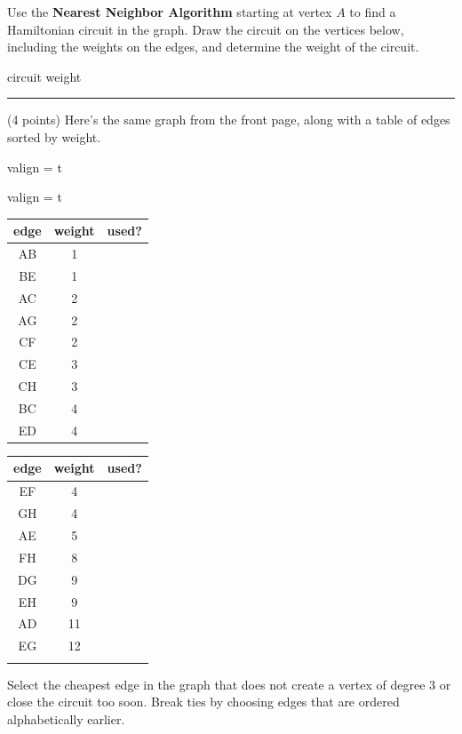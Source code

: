 \documentclass[12pt]{article}
\renewcommand{\emph}[1]{\textsf{\textbf{#1}}}
\newcommand{\ans}[1][1in]{\rule{#1}{.5pt}}
\begin{document}
Use the \emph{Nearest Neighbor Algorithm} starting at vertex $A$ to find a Hamiltonian circuit in the graph. Draw the circuit on the vertices below, including the weights on the edges, and determine the weight of the circuit.

\vspace{1cm}

 \hfill circuit weight \ans

\newpage

\item (4 points) Here's the same graph from the front page, along with a table of edges sorted by weight.

\begin{adjustbox}{valign = t%
}
\end{adjustbox} \hspace{1cm} 
\begin{adjustbox}{valign = t%
}
\begin{tabular}{c | c | c |}
edge & weight & used?\\ \hline
AB & 1 & \\
BE & 1 & \\
AC & 2 &\\
AG & 2 & \\
CF & 2 & \\
CE & 3 & \\
CH & 3 & \\
BC & 4 & \\
ED & 4 & \\
\end{tabular}
 \begin{tabular}{c | c | c}
 edge & weight & used?\\ \hline
EF & 4 & \\
GH & 4 & \\
AE & 5 & \\
 FH & 8 & \\
 DG & 9 & \\
 EH & 9 & \\
 AD & 11 & \\
 EG & 12 & \\
 &\\
 \end{tabular}
 \end{adjustbox}

 Select the cheapest edge in the graph that does not create a vertex of degree 3 or close the circuit too soon. Break ties by choosing edges that are ordered alphabetically earlier.
\end{document}
